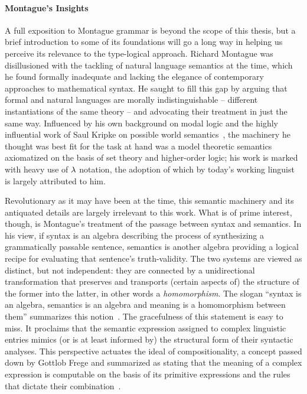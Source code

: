 \paragraph{Montague's Insights}
A full exposition to Montague grammar is beyond the scope of this thesis, but a brief introduction to some of its foundations will go a long way in helping us perceive its relevance to the type-logical approach.
Richard Montague was disillusioned with the tackling of natural language semantics at the time, which he found formally inadequate and lacking the elegance of contemporary approaches to mathematical syntax.
He saught to fill this gap by arguing that formal and natural languages are morally indistinguishable -- different instantiations of the same theory -- and advocating their treatment in just the same way.
Influenced by his own background on modal logic and the highly influential work of Saul Kripke on possible world semantics~\cite{kripke1963semantical}, the machinery he thought was best fit for the task at hand was a model theoretic semantics axiomatized on the basis of set theory and higher-order logic; his work is marked with heavy use of $\mathnormal{\lambda}$ notation, the adoption of which by today's working linguist is largely attributed to him.

Revolutionary as it may have been at the time, this semantic machinery and its antiquated details are largely irrelevant to this work.
What is of prime interest, though, is Montague's treatment of the passage between syntax and semantics.
In his view, if syntax is an algebra describing the process of synthesizing a grammatically passable sentence, semantics is another algebra providing a logical recipe for evaluating that sentence's truth-validity.
The two systems are viewed as distinct, but not independent: they are connected by a unidirectional transformation that preserves and transports (certain aspects of) the structure of the former into the latter, in other words a \textit{homomorphism}.
The slogan ``syntax is an algebra, semantics is an algebra and meaning is a homomorphism between them'' summarizes this notion~\cite{janssen2014foundations}.
The gracefulness of this statement is easy to miss. 
It proclaims that the semantic expression assigned to complex linguistic entries mimics (or is at least informed by) the structural form of their syntactic analyses.
This perspective actuates the ideal of compositionality, a concept passed down by Gottlob Frege and summarized as stating that the meaning of a complex expression is computable on the basis of its primitive expressions and the rules that dictate their combination~\cite{partee1984compositionality}.

